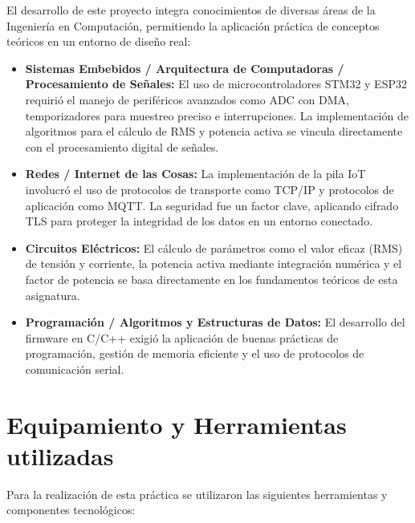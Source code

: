 \documentclass[12pt, a4paper]{article} %
\begin{document}
El desarrollo de este proyecto integra conocimientos de diversas áreas de la Ingeniería en Computación, permitiendo la aplicación práctica de conceptos teóricos en un entorno de diseño real:

\begin{itemize}
  \item \textbf{Sistemas Embebidos / Arquitectura de Computadoras / Procesamiento de Señales:} El uso de microcontroladores STM32 y ESP32 requirió el manejo de periféricos avanzados como ADC con DMA, temporizadores para muestreo preciso e interrupciones. La implementación de algoritmos para el cálculo de RMS y potencia activa se vincula directamente con el procesamiento digital de señales.
  \item \textbf{Redes / Internet de las Cosas:} La implementación de la pila IoT involucró el uso de protocolos de transporte como TCP/IP y protocolos de aplicación como MQTT. La seguridad fue un factor clave, aplicando cifrado TLS para proteger la integridad de los datos en un entorno conectado.
  \item \textbf{Circuitos Eléctricos:} El cálculo de parámetros como el valor eficaz (RMS) de tensión y corriente, la potencia activa mediante integración numérica y el factor de potencia se basa directamente en los fundamentos teóricos de esta asignatura.
  \item \textbf{Programación / Algoritmos y Estructuras de Datos:} El desarrollo del firmware en C/C++ exigió la aplicación de buenas prácticas de programación, gestión de memoria eficiente y el uso de protocolos de comunicación serial.
\end{itemize}

\section{Equipamiento y Herramientas utilizadas}

Para la realización de esta práctica se utilizaron las siguientes herramientas y componentes tecnológicos:
\end{document}
